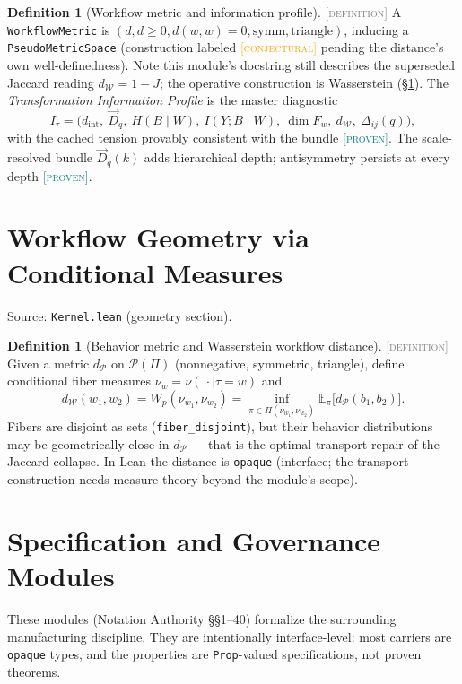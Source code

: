\documentclass[11pt]{article}
\newcommand{\PROVEN}{\textcolor{teal}{\textsc{[proven]}}}
\newcommand{\DEFINITION}{\textcolor{gray}{\textsc{[definition]}}}
\newcommand{\CONJECTURAL}{\textcolor{orange}{\textsc{[conjectural]}}}
\newcommand{\PT}{\Pi}                          %
\newcommand{\PS}{\mathcal{P}(\PT)}             %
\newcommand{\tmap}{\tau}                       %
\newcommand{\fib}[1]{F_{#1}}                   %
\newcommand{\dW}{d_{\mathcal{W}}}
\newcommand{\dP}{d_{\mathcal{P}}}
\theoremstyle{plain}
\theoremstyle{definition}
\newtheorem{definition}[theorem]{Definition}
\begin{document}
\begin{definition}[Workflow metric and information profile]\DEFINITION\;
A \texttt{WorkflowMetric} is $(d, d \ge 0, d(w,w) = 0, \text{symm},
\text{triangle})$, inducing a \texttt{PseudoMetricSpace} (construction
labeled \CONJECTURAL{} pending the distance's own well-definedness). Note
this module's docstring still describes the superseded Jaccard reading
$\dW = 1 - J$; the operative construction is Wasserstein
(\S\ref{sec:geometry}). The \emph{Transformation Information Profile} is the
master diagnostic
\[
  I_\tmap = \big(d_{\mathrm{int}},\ \vec{D}_q,\ H(B \mid W),\
  I(Y; B \mid W),\ \dim \fib{w},\ \dW,\ \Delta_{ij}(q)\big),
\]
with the cached tension provably consistent with the bundle \PROVEN. The
scale-resolved bundle $\vec{D}_q(k)$ adds hierarchical depth; antisymmetry
persists at every depth \PROVEN.
\end{definition}

\section{Workflow Geometry via Conditional Measures}
\label{sec:geometry}
Source: \texttt{Kernel.lean} (geometry section).

\begin{definition}[Behavior metric and Wasserstein workflow distance]
\DEFINITION\;
Given a metric $\dP$ on $\PS$ (nonnegative, symmetric, triangle), define
conditional fiber measures $\nu_w = \nu(\,\cdot \mid \tmap = w)$ and
\[
  \dW(w_1, w_2) = W_p(\nu_{w_1}, \nu_{w_2})
  = \inf_{\pi \in \Pi(\nu_{w_1}, \nu_{w_2})}
    \mathbb{E}_\pi\big[\dP(b_1, b_2)\big].
\]
Fibers are disjoint as sets (\texttt{fiber\_disjoint}), but their behavior
distributions may be geometrically close in $\dP$ --- that is the
optimal-transport repair of the Jaccard collapse. In Lean the distance is
\texttt{opaque} (interface; the transport construction needs measure theory
beyond the module's scope).
\end{definition}

\section{Specification and Governance Modules}
\label{sec:governance}
These modules (Notation Authority \S\S1--40) formalize the surrounding
manufacturing discipline. They are intentionally interface-level: most
carriers are \texttt{opaque} types, and the properties are
\texttt{Prop}-valued specifications, not proven theorems.
\end{document}

